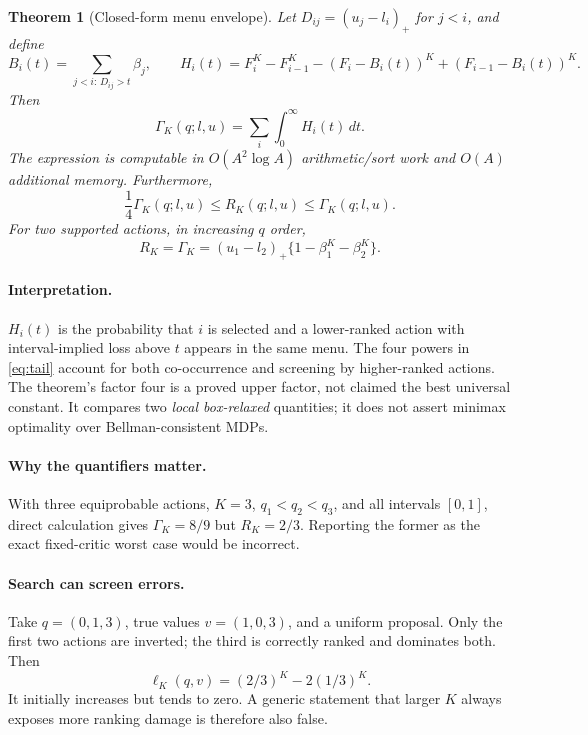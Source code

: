 \documentclass[11pt]{article}
\newtheorem{theorem}{Theorem}
\begin{document}
\begin{theorem}[Closed-form menu envelope]\label{thm:envelope}
Let $D_{ij}=(u_j-l_i)_+$ for $j<i$, and define
\begin{equation}
 B_i(t)=\sum_{j<i:\,D_{ij}>t}\beta_j,\qquad
 H_i(t)=F_i^K-F_{i-1}^K-(F_i-B_i(t))^K+(F_{i-1}-B_i(t))^K.
 \label{eq:tail}
\end{equation}
Then
\begin{equation}
 \Gamma_K(q;l,u)=\sum_i\int_0^\infty H_i(t)\,dt.
 \label{eq:integral}
\end{equation}
The expression is computable in $O(A^2\log A)$ arithmetic/sort work and $O(A)$ additional memory. Furthermore,
\begin{equation}
 \frac14\Gamma_K(q;l,u)\le R_K(q;l,u)\le\Gamma_K(q;l,u).
 \label{eq:factor}
\end{equation}
For two supported actions, in increasing $q$ order,
\begin{equation}
 R_K=\Gamma_K=(u_1-l_2)_+\{1-\beta_1^K-\beta_2^K\}.
 \label{eq:two-action}
\end{equation}
\end{theorem}
\paragraph{Interpretation.} $H_i(t)$ is the probability that $i$ is selected and a lower-ranked action with interval-implied loss above $t$ appears in the same menu. The four powers in \eqref{eq:tail} account for both co-occurrence and screening by higher-ranked actions. The theorem's factor four is a proved upper factor, not claimed the best universal constant. It compares two \emph{local box-relaxed} quantities; it does not assert minimax optimality over Bellman-consistent MDPs.

\paragraph{Why the quantifiers matter.} With three equiprobable actions, $K=3$, $q_1<q_2<q_3$, and all intervals $[0,1]$, direct calculation gives $\Gamma_K=8/9$ but $R_K=2/3$. Reporting the former as the exact fixed-critic worst case would be incorrect.

\paragraph{Search can screen errors.} Take $q=(0,1,3)$, true values $v=(1,0,3)$, and a uniform proposal. Only the first two actions are inverted; the third is correctly ranked and dominates both. Then
\begin{equation}
 \ell_K(q,v)=(2/3)^K-2(1/3)^K.
 \label{eq:screen}
\end{equation}
It initially increases but tends to zero. A generic statement that larger $K$ always exposes more ranking damage is therefore also false.
\end{document}
